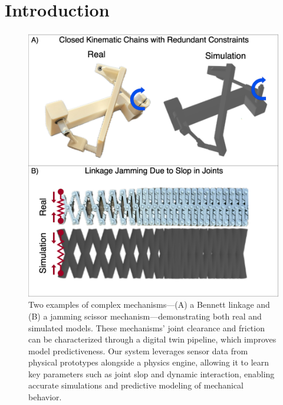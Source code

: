 \section{Introduction} \label{intro}
\begin{figure}
    \includegraphics[width=\linewidth]{Figures/scissor_slop.drawio.png}
    \caption{Two examples of complex mechanisms—(A) a Bennett linkage and (B) a jamming scissor mechanism—demonstrating both real and simulated models. These mechanisms' joint clearance and friction can be characterized through a digital twin pipeline, which improves model predictiveness. Our system leverages sensor data from physical prototypes alongside a physics engine, allowing it to learn key parameters such as joint slop and dynamic interaction, enabling accurate simulations and predictive modeling of mechanical behavior.}
    \label{fig:Hero-Figure}
\end{figure}
